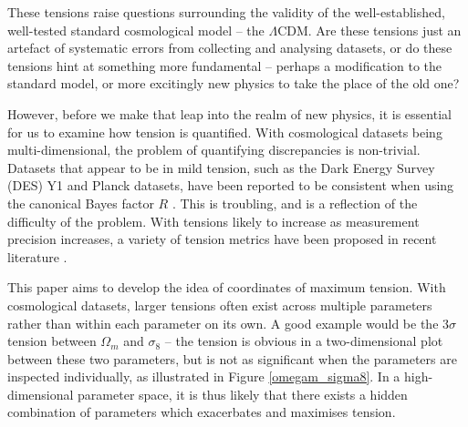 \documentclass[%
 reprint,
 amsmath,amssymb,
 aps,
]{revtex4-2}
\begin{document}
These tensions raise questions surrounding the validity of the well-established, well-tested standard cosmological model -- the $\Lambda$CDM. Are these tensions just an artefact of systematic errors from collecting and analysing datasets, or do these tensions hint at something more fundamental -- perhaps a modification to the standard model, or more excitingly new physics to take the place of the old one?

However, before we make that leap into the realm of new physics, it is essential for us to examine how tension is quantified. With cosmological datasets being multi-dimensional, the problem of quantifying discrepancies is non-trivial. Datasets that appear to be in mild tension, such as the Dark Energy Survey (DES) Y1 and Planck datasets, have been reported to be consistent when using the canonical Bayes factor $R$ \cite{Handley2019}. This is troubling, and is a reflection of the difficulty of the problem. With tensions likely to increase as measurement precision increases, a variety of tension metrics have been proposed in recent literature \cite{Charnock2017}.

This paper aims to develop the idea of coordinates of maximum tension. With cosmological datasets, larger tensions often exist across multiple parameters rather than within each parameter on its own. A good example would be the $3 \sigma$ tension between $\Omega_m$ and $\sigma_8$ -- the tension is obvious in a two-dimensional plot between these two parameters, but is not as significant when the parameters are inspected individually, as illustrated in Figure \ref{omegam_sigma8}. In a high-dimensional parameter space, it is thus likely that there exists a hidden combination of parameters which exacerbates and maximises tension.
\end{document}
